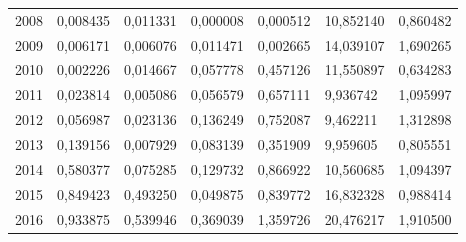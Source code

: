 \begin{table}
\begin{tabular}{p{1cm}p{2cm}p{2cm}p{2cm}p{2cm}p{2cm}p{2cm}}
 2008 &                                  0,008435 &                 0,011331 &                                 0,000008 &                            0,000512 &                                   10,852140 &                        0,860482 \\
 2009 &                                  0,006171 &                 0,006076 &                                 0,011471 &                            0,002665 &                                   14,039107 &                        1,690265 \\
 2010 &                                  0,002226 &                 0,014667 &                                 0,057778 &                            0,457126 &                                   11,550897 &                        0,634283 \\
 2011 &                                  0,023814 &                 0,005086 &                                 0,056579 &                            0,657111 &                                    9,936742 &                        1,095997 \\
 2012 &                                  0,056987 &                 0,023136 &                                 0,136249 &                            0,752087 &                                    9,462211 &                        1,312898 \\
 2013 &                                  0,139156 &                 0,007929 &                                 0,083139 &                            0,351909 &                                    9,959605 &                        0,805551 \\
 2014 &                                  0,580377 &                 0,075285 &                                 0,129732 &                            0,866922 &                                   10,560685 &                        1,094397 \\
 2015 &                                  0,849423 &                 0,493250 &                                 0,049875 &                            0,839772 &                                   16,832328 &                        0,988414 \\
 2016 &                                  0,933875 &                 0,539946 &                                 0,369039 &                            1,359726 &                                   20,476217 &                        1,910500 \\
\bottomrule
\end{tabular}
\end{table}
